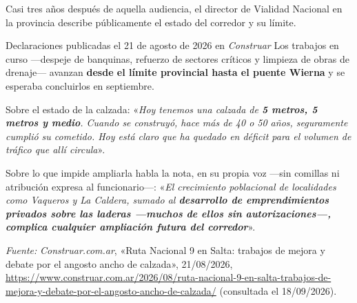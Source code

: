 Casi tres años después de aquella audiencia, el director de Vialidad Nacional en la provincia
describe públicamente el estado del corredor y su límite.

\begin{ficha}{Declaraciones publicadas el 21 de agosto de 2026 en \textit{Construar}}
Los trabajos en curso ---despeje de banquinas, refuerzo de sectores críticos y limpieza de obras
de drenaje--- avanzan \textbf{desde el límite provincial hasta el puente Wierna} y se esperaba
concluirlos en septiembre.

Sobre el estado de la calzada: «\textit{Hoy tenemos una calzada de \textbf{5 metros, 5 metros y
medio}. Cuando se construyó, hace más de 40 o 50 años, seguramente cumplió su cometido. Hoy está
claro que ha quedado en déficit para el volumen de tráfico que allí circula}».

Sobre lo que impide ampliarla habla la nota, en su propia voz ---sin comillas ni atribución
expresa al funcionario---: «\textit{El crecimiento poblacional de localidades como
Vaqueros y La Caldera, sumado al \textbf{desarrollo de emprendimientos privados sobre las
laderas ---muchos de ellos sin autorizaciones---, complica cualquier ampliación futura del
corredor}}».

\textit{Fuente:} \textit{Construar.com.ar}, «Ruta Nacional 9 en Salta: trabajos de mejora y
debate por el angosto ancho de calzada», 21/08/2026,
\url{https://www.construar.com.ar/2026/08/ruta-nacional-9-en-salta-trabajos-de-mejora-y-debate-por-el-angosto-ancho-de-calzada/}
(consultada el 18/09/2026).
\end{ficha}

